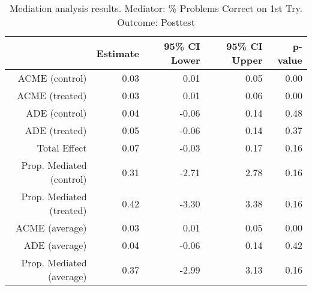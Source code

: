 \begin{table}[ht]
\centering
\begin{tabular}{rrrrr}
  \hline
 & Estimate & 95\% CI Lower & 95\% CI Upper & p-value \\ 
  \hline
ACME (control) & 0.03 & 0.01 & 0.05 & 0.00 \\ 
  ACME (treated) & 0.03 & 0.01 & 0.06 & 0.00 \\ 
  ADE (control) & 0.04 & -0.06 & 0.14 & 0.48 \\ 
  ADE (treated) & 0.05 & -0.06 & 0.14 & 0.37 \\ 
  Total Effect & 0.07 & -0.03 & 0.17 & 0.16 \\ 
  Prop. Mediated (control) & 0.31 & -2.71 & 2.78 & 0.16 \\ 
  Prop. Mediated (treated) & 0.42 & -3.30 & 3.38 & 0.16 \\ 
  ACME (average) & 0.03 & 0.01 & 0.05 & 0.00 \\ 
  ADE (average) & 0.04 & -0.06 & 0.14 & 0.42 \\ 
  Prop. Mediated (average) & 0.37 & -2.99 & 3.13 & 0.16 \\ 
   \hline
\end{tabular}
\caption{Mediation analysis results. Mediator: \% Problems Correct on 1st Try. Outcome: Posttest} 
\end{table}
